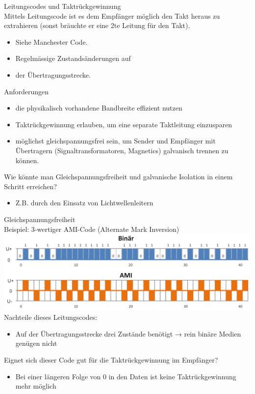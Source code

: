 \begin{definition}{Leitungscodes und Taktrückgewinnung}\\
    Mittels Leitungscode ist es dem Empfänger möglich den Takt heraus zu extrahieren (sonst bräuchte er eine 2te Leitung für den Takt).
\begin{itemize}
    \item Siehe Manchester Code.
    \item Regelmässige Zustandsänderungen auf
    \item der Übertragungsstrecke.
\end{itemize}

\end{definition}
\begin{theorem}{Anforderungen}
\begin{itemize}
    \item die physikalisch vorhandene Bandbreite effizient nutzen
    \item Taktrückgewinnung erlauben, um eine separate Taktleitung einzusparen
    \item möglichst gleichspannungsfrei sein, um Sender und Empfänger mit Übertragern (Signaltransformatoren, Magnetics) galvanisch trennen zu können.
\end{itemize} 
\end{theorem}

\begin{example}
    Wie könnte man Gleichspannungsfreiheit und galvanische Isolation in einem Schritt erreichen?
    \begin{itemize}
        \item Z.B. durch den Einsatz von Lichtwellenleitern
    \end{itemize}
\end{example}

\begin{KR}{Gleichspannungsfreiheit}\\
    Beispiel: 3-wertiger AMI-Code (Alternate Mark Inversion)\\
    \includegraphics[width=0.9\linewidth]{images/gleichspannungsfreiheit.png}\\
    Nachteile dieses Leitungscodes:
    \begin{itemize}
        \item Auf der Übertragungsstrecke drei Zustände benötigt → rein binäre Medien genügen nicht
    \end{itemize}
    Eignet sich dieser Code gut für die Taktrückgewinnung im Empfänger?
    \begin{itemize}
        \item Bei einer längeren Folge von 0 in den Daten ist keine Taktrückgewinnung mehr möglich
    \end{itemize}
\end{KR}

